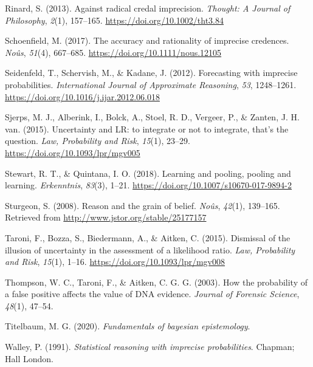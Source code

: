 \documentclass[
  10pt,
  dvipsnames,enabledeprecatedfontcommands]{scrartcl}
\newlength{\cslhangindent}
\newlength{\cslentryspacingunit} %
\newenvironment{CSLReferences}[2] %
 {%
  \setlength{\parindent}{0pt}
  \ifodd #1
  \let\oldpar\par
  \def\par{\hangindent=\cslhangindent\oldpar}
  \fi
  \setlength{\parskip}{#2\cslentryspacingunit}
 }%
 {}
\begin{document}
\begin{CSLReferences}{1}{0}
\leavevmode{}%
Rinard, S. (2013). Against radical credal imprecision. \emph{Thought: A
Journal of Philosophy}, \emph{2}(1), 157--165.
\url{https://doi.org/10.1002/tht3.84}

\leavevmode{}%
Schoenfield, M. (2017). The accuracy and rationality of imprecise
credences. \emph{Noûs}, \emph{51}(4), 667--685.
\url{https://doi.org/10.1111/nous.12105}

\leavevmode{}%
Seidenfeld, T., Schervish, M., \& Kadane, J. (2012). Forecasting with
imprecise probabilities. \emph{International Journal of Approximate
Reasoning}, \emph{53}, 1248--1261.
\url{https://doi.org/10.1016/j.ijar.2012.06.018}

\leavevmode{}%
Sjerps, M. J., Alberink, I., Bolck, A., Stoel, R. D., Vergeer, P., \&
Zanten, J. H. van. (2015). {Uncertainty and LR: to integrate or not to
integrate, that's the question}. \emph{Law, Probability and Risk},
\emph{15}(1), 23--29. \url{https://doi.org/10.1093/lpr/mgv005}

\leavevmode{}%
Stewart, R. T., \& Quintana, I. O. (2018). Learning and pooling, pooling
and learning. \emph{Erkenntnis}, \emph{83}(3), 1--21.
\url{https://doi.org/10.1007/s10670-017-9894-2}

\leavevmode{}%
Sturgeon, S. (2008). Reason and the grain of belief. \emph{No{û}s},
\emph{42}(1), 139--165. Retrieved from
\url{http://www.jstor.org/stable/25177157}

\leavevmode{}%
Taroni, F., Bozza, S., Biedermann, A., \& Aitken, C. (2015). {Dismissal
of the illusion of uncertainty in the assessment of a likelihood ratio}.
\emph{Law, Probability and Risk}, \emph{15}(1), 1--16.
\url{https://doi.org/10.1093/lpr/mgv008}

\leavevmode{}%
Thompson, W. C., Taroni, F., \& Aitken, C. G. G. (2003). How the
probability of a false positive affects the value of {DNA} evidence.
\emph{Journal of Forensic Science}, \emph{48}(1), 47--54.

\leavevmode{}%
Titelbaum, M. G. (2020). \emph{Fundamentals of bayesian epistemology}.

\leavevmode{}%
Walley, P. (1991). \emph{Statistical reasoning with imprecise
probabilities}. Chapman; Hall London.

\end{CSLReferences}
\end{document}
